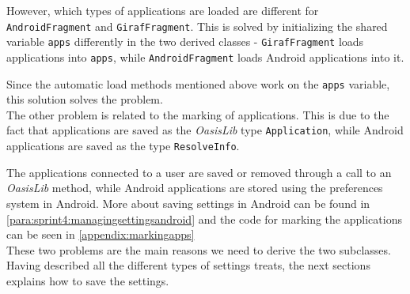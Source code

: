 However, which types of applications are loaded are different for \lstinline!AndroidFragment! and \lstinline!GirafFragment!.
This is solved by initializing the shared variable \lstinline!apps! differently in the two derived classes -
\lstinline!GirafFragment! loads \giraf applications into \lstinline!apps!, while \lstinline!AndroidFragment! loads Android applications into it.

Since the automatic load methods mentioned above work on the \lstinline!apps! variable, this solution solves the problem. \\

The other problem is related to the marking of applications.
This is due to the fact that \giraf applications are saved as the \textit{OasisLib} type \lstinline!Application!, while Android applications are saved as the type \lstinline!ResolveInfo!.

The \giraf applications connected to a user are saved or removed through a call to an \textit{OasisLib} method, while Android applications are stored using the preferences system in Android.
More about saving settings in Android can be found in \cref{para:sprint4:managingsettingsandroid} and the code for marking the applications can be seen in \cref{appendix:markingapps}\\

These two problems are the main reasons we need to derive the two subclasses.\\

Having described all the different types of settings \launcher treats, the next sections explains how to save the settings.